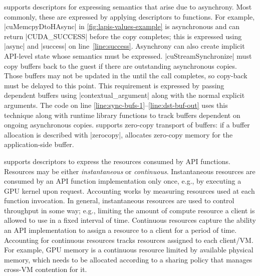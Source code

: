 { \Lapis supports descriptors
for expressing semantics that arise due to asynchrony.
Most commonly, these are expressed by applying descriptors to functions.
For example, \spec|cuMemcpyDtoHAsync| in \autoref{fig:lapis-values-example}
is asynchronous and can return \spec|CUDA_SUCCESS| before the copy completes;
this is expressed using \spec|async| and \spec|success| on line~\ref{line:success}.
Asynchrony can also create implicit API-level state whose semantics must be expressed.
\spec|cuStreamSynchronize| must copy buffers back to the guest if there are outstanding asynchronous copies.
Those buffers may not be updated in the \worker until the call completes, so copy-back must be delayed to this point.
This requirement is expressed by passing dependent buffers using \spec|contextual_argument| along with the normal explicit arguments. The \Lapis code on line \ref{line:sync-bufs-1}--\ref{line:dst-buf-out}
uses this technique along with runtime library functions to track buffers dependent on ongoing asynchronous copies.
\AvA supports zero-copy transport of buffers: if a buffer allocation is described with \spec|zerocopy|, \CAvA allocates zero-copy memory for the application-side buffer.

\Lapis supports descriptors to express the resources consumed by API functions.
Resources may be either \emph{instantaneous} or \emph{continuous}.
Instantaneous resources are consumed by an API function implementation only once,
e.g., by executing a GPU kernel upon request. Accounting works by measuring resources used at each function invocation.
In general, instantaneous resources are used to control throughput in some way; e.g.,
limiting the amount of compute resource a client is allowed to use in a fixed interval of time.
Continuous resources capture the ability an API implementation to assign a resource to a client for a
period of time. Accounting for continuous resources tracks resources assigned to each client/VM.
For example, GPU memory is a continuous resource limited by available physical memory,
which needs to be allocated
according to a sharing policy that manages cross-VM contention for it.

}
